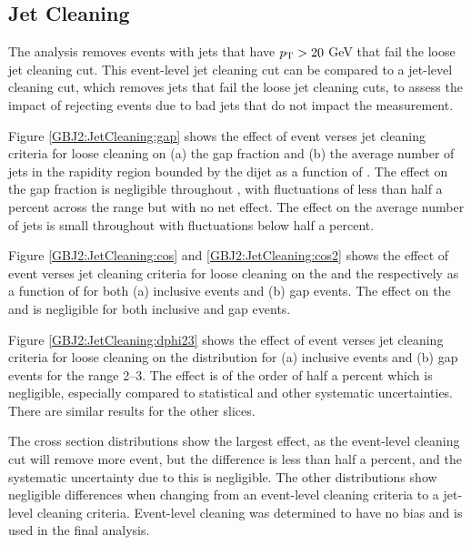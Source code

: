 \subsection{Jet Cleaning}
\label{sec:GBJ2:Cleaning}

The analysis removes events with jets that have $\mbox{$p_{\rm T}$}{}>20$ GeV  that fail the loose jet cleaning cut.
This event-level jet cleaning cut can be compared to a jet-level cleaning cut, which removes jets that fail the loose jet cleaning cuts, to assess the impact of rejecting events due to bad jets that do not impact the measurement.



Figure \ref{GBJ2:JetCleaning:gap} shows the effect of event verses jet cleaning criteria for loose cleaning on (a) the gap fraction and (b) the average number of jets in the rapidity region bounded by the dijet as a function of \dy{}.
The effect on the gap fraction is negligible throughout \dy{}, with fluctuations of less than half a percent across the \dy{} range but with no net effect.
The effect on the average number of jets is small throughout \dy{} with fluctuations below half a percent.

Figure \ref{GBJ2:JetCleaning:cos} and \ref{GBJ2:JetCleaning:cos2} shows the effect of event verses jet cleaning criteria for loose cleaning on the \mean{\cosdphi{}} and the \mean{\costwodphi{}} respectively as a function of \dy{} for both (a) inclusive events and (b) gap events.
The effect on the \mean{\cosdphi{}} and \mean{\costwodphi{}} is negligible for both inclusive and gap events.

Figure \ref{GBJ2:JetCleaning:dphi23} shows the effect of event verses jet cleaning criteria for loose cleaning on the \dphi{} distribution for (a) inclusive events and (b) gap events for the \dy{} range 2--3. 
The effect is of the order of half a percent which is negligible, especially compared to statistical and other systematic uncertainties.
There are similar results for the other \dy{} slices.

The cross section distributions show the largest effect, as the event-level cleaning cut will remove more event, but the difference is less than half a percent, and the systematic uncertainty due to this is negligible.
The other distributions show negligible differences when changing from an event-level cleaning criteria to a jet-level cleaning criteria. 
Event-level cleaning was determined to have no bias and is used in the final analysis. 









